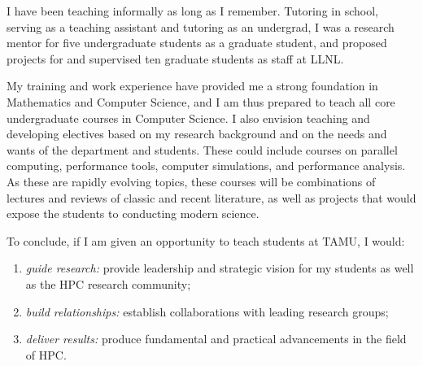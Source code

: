 \documentclass[10pt,letterpaper]{moderncv/moderncv}
\begin{document}
I have been teaching informally as long as I remember.  Tutoring in school, serving as a teaching assistant and tutoring as an undergrad,
I was a research mentor for five undergraduate students as a graduate student, and proposed projects for and supervised ten graduate students as staff at LLNL.

My training and work experience have provided me a strong foundation in Mathematics and Computer Science, and I am thus prepared to teach all core undergraduate
courses in Computer Science.  I also envision teaching and developing electives based on my research background and on the needs and wants of the department and students.
These could include courses on parallel computing, performance tools, computer simulations, and performance analysis.
As these are rapidly evolving topics, these courses will be combinations of lectures and reviews of classic and recent literature,
as well as projects that would expose the students to conducting modern science.


To conclude, if I am given an opportunity to teach students at TAMU, I would:

\begin{enumerate}
\item \emph{guide research:} provide leadership and strategic vision for my students as well as the HPC research community;
\item \emph{build relationships:} establish collaborations with leading research groups;
\item \emph{deliver results:} produce fundamental and practical advancements in the field of HPC.
\end{enumerate}
\end{document}
